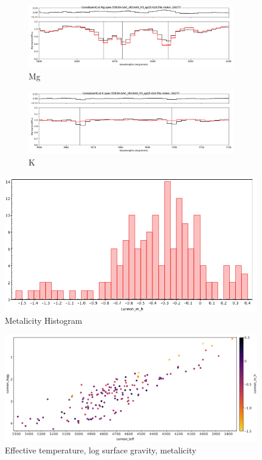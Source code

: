 \documentclass[a4paper,fleqn,usenatbib]{mnras}
\begin{document}
\begin{figure}
\centering
\begin{subfigure}{.5\linewidth}
  \centering
  \includegraphics[width=.95\linewidth]{29277_Mg}
  \caption{Mg}
  \label{Mgposter}
\end{subfigure}%

\begin{subfigure}{.5\linewidth}
  \centering
  \includegraphics[width=.95\linewidth]{29277_K}
  \caption{K}
  \label{Kposter}
\end{subfigure}
\caption{}
\label{posterchildren}
\end{figure} 

\begin{figure}
	\includegraphics[width=\columnwidth]{m_hhist.png}
    \caption{Metalicity Histogram}
    \label{mhist}
\end{figure}


\begin{figure}
	\includegraphics[width=\columnwidth]{teff_logg.png}
    \caption{Effective temperature, log surface gravity, metalicity}
    \label{mhist}
\end{figure}
\end{document}
